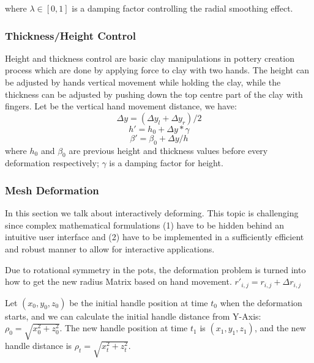 where $\lambda \in [0,1]$ is a damping factor controlling the radial smoothing effect.

\subsubsection{Thickness/Height Control}
\label{sec:4.2.2}
Height and thickness control are  basic clay manipulations in pottery creation process which are done by applying force to clay with two hands. The height can be adjusted by hands vertical movement while holding the clay, while the thickness can be adjusted by pushing down the top centre part of the clay with fingers. Let  be the vertical hand movement distance, we have:
\begin{equation}
\Delta y = (\Delta y_{l} + \Delta y_{r})/2
\end{equation}
\begin{equation}
h' = h_{0} + \Delta y * \gamma
\end{equation}
\begin{equation}
\beta' = \beta_{0} + \Delta y/ h
\end{equation}
where $h_{0}$ and $\beta_{0}$ are previous height and thickness values before every deformation respectively; $\gamma$ is a damping factor for height.

\subsubsection{Mesh Deformation}
\label{sec:4.2.3}
In this section we talk about interactively deforming. This topic is challenging since complex mathematical formulations (1) have to be hidden behind an intuitive user interface and (2) have to be implemented in a sufficiently efficient and robust manner to allow for interactive applications.\cite{botsch2010polygon}

Due to rotational symmetry in the pots, the deformation problem is turned into how to get the new radius Matrix based on hand movement. $r'_{i,j} = r_{i,j} + \Delta r_{i,j}$

Let $(x_{0},y_{0},z_{0})$ be the initial handle position at time $t_{0}$ when the deformation starts, and we can calculate the initial handle distance from Y-Axis: $\rho_{0} = \sqrt{x_{0}^2 + z_{0}^2}$. The new handle position at time $t_{1}$ is $(x_{1},y_{1},z_{1})$, and the new handle distance is $\rho_{t} = \sqrt{x_{t}^2 + z_{t}^2}$.

